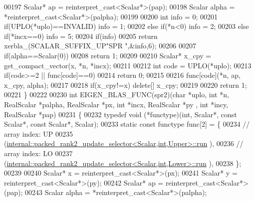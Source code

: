 \begin{DoxyCode}
00197   Scalar* ap = \textcolor{keyword}{reinterpret\_cast<}Scalar*\textcolor{keyword}{>}(pap);
00198   Scalar alpha = *\textcolor{keyword}{reinterpret\_cast<}Scalar*\textcolor{keyword}{>}(palpha);
00199 
00200   \textcolor{keywordtype}{int} info = 0;
00201   \textcolor{keywordflow}{if}(UPLO(*uplo)==INVALID)                                            info = 1;
00202   \textcolor{keywordflow}{else} \textcolor{keywordflow}{if}(*n<0)                                                       info = 2;
00203   \textcolor{keywordflow}{else} \textcolor{keywordflow}{if}(*incx==0)                                                   info = 5;
00204   \textcolor{keywordflow}{if}(info)
00205     \textcolor{keywordflow}{return} xerbla\_(SCALAR\_SUFFIX\_UP\textcolor{stringliteral}{"SPR  "},&info,6);
00206 
00207   \textcolor{keywordflow}{if}(alpha==Scalar(0))
00208     \textcolor{keywordflow}{return} 1;
00209 
00210   Scalar* x\_cpy = get\_compact\_vector(x, *n, *incx);
00211 
00212   \textcolor{keywordtype}{int} code = UPLO(*uplo);
00213   \textcolor{keywordflow}{if}(code>=2 || func[code]==0)
00214     \textcolor{keywordflow}{return} 0;
00215 
00216   func[code](*n, ap, x\_cpy, alpha);
00217 
00218   \textcolor{keywordflow}{if}(x\_cpy!=x)  \textcolor{keyword}{delete}[] x\_cpy;
00219 
00220   \textcolor{keywordflow}{return} 1;
00221 \}
00222 
00230 \textcolor{keywordtype}{int} EIGEN\_BLAS\_FUNC(spr2)(\textcolor{keywordtype}{char} *uplo, \textcolor{keywordtype}{int} *n, RealScalar *palpha, RealScalar *px, \textcolor{keywordtype}{int} *incx, RealScalar *py
      , \textcolor{keywordtype}{int} *incy, RealScalar *pap)
00231 \{
00232   \textcolor{keyword}{typedef} void (*functype)(int, Scalar*, \textcolor{keyword}{const} Scalar*, \textcolor{keyword}{const} Scalar*, Scalar);
00233   \textcolor{keyword}{static} \textcolor{keyword}{const} functype func[2] = \{
00234     \textcolor{comment}{// array index: UP}
00235     (\hyperlink{structinternal_1_1packed__rank2__update__selector}{internal::packed\_rank2\_update\_selector<Scalar,int,Upper>::run}
      ),
00236     \textcolor{comment}{// array index: LO}
00237     (\hyperlink{structinternal_1_1packed__rank2__update__selector}{internal::packed\_rank2\_update\_selector<Scalar,int,Lower>::run}
      ),
00238   \};
00239 
00240   Scalar* x = \textcolor{keyword}{reinterpret\_cast<}Scalar*\textcolor{keyword}{>}(px);
00241   Scalar* y = \textcolor{keyword}{reinterpret\_cast<}Scalar*\textcolor{keyword}{>}(py);
00242   Scalar* ap = \textcolor{keyword}{reinterpret\_cast<}Scalar*\textcolor{keyword}{>}(pap);
00243   Scalar alpha = *\textcolor{keyword}{reinterpret\_cast<}Scalar*\textcolor{keyword}{>}(palpha);

\end{DoxyCode}
